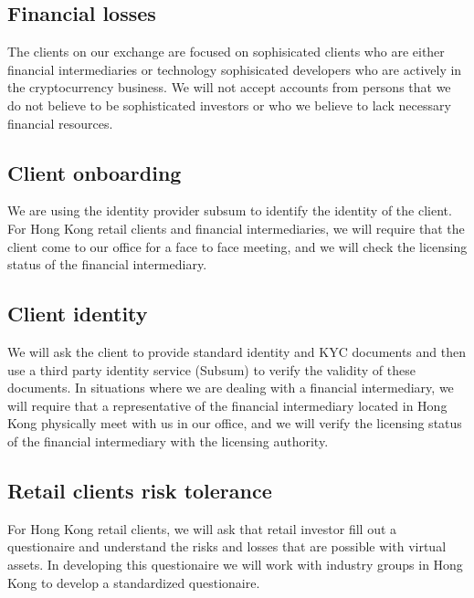\subsection{Financial losses}

The clients on our exchange are focused on sophisicated clients who
are either financial intermediaries or technology sophisicated
developers who are actively in the cryptocurrency business.  We will
not accept accounts from persons that we do not believe to be
sophisticated investors or who we believe to lack necessary financial
resources.

\subsection{Client onboarding}

We are using the identity provider subsum to identify the identity of
the client.  For Hong Kong retail clients and financial
intermediaries, we will require that the client come to our office for
a face to face meeting, and we will check the licensing status of the
financial intermediary.

\subsection{Client identity}
We will ask the client to provide standard identity and KYC documents
and then use a third party identity service (Subsum) to verify the
validity of these documents.  In situations where we are dealing with
a financial intermediary, we will require that a representative of the
financial intermediary located in Hong Kong physically meet with us in
our office, and we will verify the licensing status of the financial
intermediary with the licensing authority.

\subsection{Retail clients risk tolerance}

For Hong Kong retail clients, we will ask that retail investor fill
out a questionaire and understand the risks and losses that are
possible with virtual assets.  In developing this questionaire we will
work with industry groups in Hong Kong to develop a standardized
questionaire.

